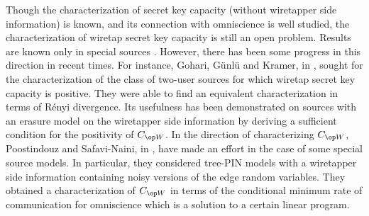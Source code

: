 Though the characterization of secret key capacity (without wiretapper side information) is known, and its connection with omniscience is well studied, the characterization of wiretap secret key capacity is still an open problem. Results are known only in special sources \cite{ahlswedeCRpart1, maurer93}. However, there has been some progress in this direction in recent times.  For instance,  Gohari, G\"{u}nl\"{u} and Kramer, in \cite{amin2020}, sought for the characterization of the class of two-user sources for which wiretap secret key capacity is positive. They were able to find an equivalent characterization in terms of R\'enyi divergence. Its usefulness has been demonstrated on  sources with an erasure model on the wiretapper side information   by deriving a sufficient condition for the positivity of $\wskc$. In the direction of characterizing $\wskc$,  Poostindouz and Safavi-Naini, in \cite{alireza19}, have made an effort in the case of some special source models. In particular, they considered tree-PIN models with a  wiretapper side information containing  noisy versions of the edge random variables. They obtained a characterization of $\wskc$ in terms of the conditional minimum rate of communication for omniscience which is a solution to a certain linear program.





